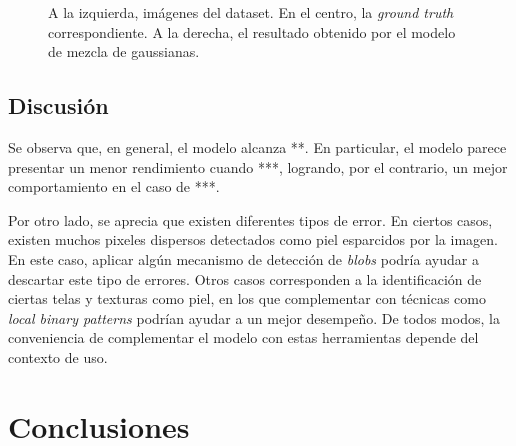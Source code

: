 \documentclass[12pt]{article}
\begin{document}
\begin{figure}[h]
   \hfill{}
    \caption{A la izquierda, imágenes del dataset. En el centro, la \emph{ground
    truth} correspondiente. A la derecha, el resultado obtenido por el modelo de
    mezcla de gaussianas.}
\end{figure}

\subsection{Discusión}

Se observa que, en general, el modelo alcanza **. En particular, el modelo
parece presentar un menor rendimiento cuando ***, logrando, por el contrario, un
mejor comportamiento en el caso de ***. 

Por otro lado, se aprecia que existen diferentes tipos de error. En ciertos
casos, existen muchos pixeles dispersos detectados como piel esparcidos por la
imagen. En este caso, aplicar algún mecanismo de detección de \emph{blobs}
podría ayudar a descartar este tipo de errores. Otros casos corresponden a la
identificación de ciertas telas y texturas como piel, en los que complementar
con técnicas como \emph{local binary patterns} podrían ayudar a un mejor
desempeño. De todos modos, la conveniencia de complementar el modelo con estas
herramientas depende del contexto de uso.

\section{Conclusiones}


\end{document}
